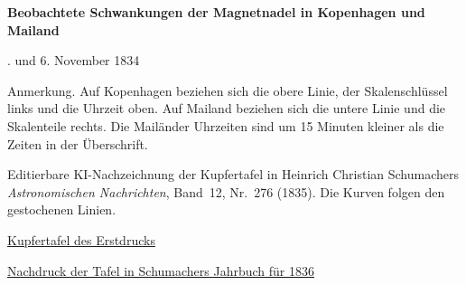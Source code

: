 \clearpage
\thispagestyle{empty}
\begin{center}
{\Large\bfseries Beobachtete Schwankungen der Magnetnadel in Kopenhagen und Mailand\par}
. und 6. November 1834\par
\medskip
\begingroup
\def\GaussCopenhagenPlateMarkers{\node[anchor=west,font=\tiny,fill=white,inner sep=.5pt] at (1244,385) {5. Nov. vorm.};
\node[anchor=west,font=\tiny,fill=white,inner sep=.5pt] at (1659,385) {nachm.};
\node[anchor=west,font=\tiny,fill=white,inner sep=.5pt] at (2277,385) {6. Nov. vorm.};
\node[anchor=west,font=\tiny,fill=white,inner sep=.5pt] at (2894,385) {nachm.};}

\endgroup
\end{center}
\noindent Anmerkung. Auf Kopenhagen beziehen sich die obere Linie, der Skalenschlüssel links und die Uhrzeit oben. Auf Mailand beziehen sich die untere Linie und die Skalenteile rechts. Die Mailänder Uhrzeiten sind um 15 Minuten kleiner als die Zeiten in der Überschrift.
\par\medskip
\noindent Editierbare KI-Nachzeichnung der Kupfertafel in Heinrich Christian Schumachers \textit{Astronomischen Nachrichten}, Band~12, Nr.~276 (1835). Die Kurven folgen den gestochenen Linien.
\par\medskip
\noindent\href{https://www.digitale-sammlungen.de/view/bsb10049437?page=231}{Kupfertafel des Erstdrucks}\par
\noindent\href{https://www.digitale-sammlungen.de/view/bsb11040033?page=277}{Nachdruck der Tafel in Schumachers Jahrbuch für 1836}\par
\clearpage
